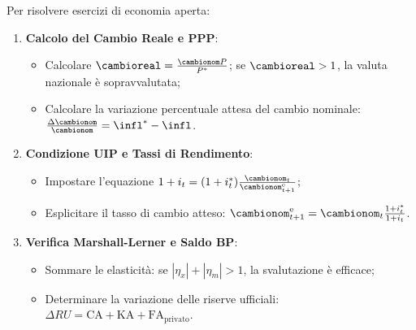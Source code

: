\begin{metodo}
Per risolvere esercizi di economia aperta:
\begin{enumerate}
    \item \textbf{Calcolo del Cambio Reale e PPP}:
    \begin{itemize}
        \item Calcolare $\cambioreal = \frac{\cambionom P}{P^*}$; se $\cambioreal > 1$, la valuta nazionale è sopravvalutata;
        \item Calcolare la variazione percentuale attesa del cambio nominale: $\frac{\Delta \cambionom}{\cambionom} = \infl^* - \infl$.
    \end{itemize}
    \item \textbf{Condizione UIP e Tassi di Rendimento}:
    \begin{itemize}
        \item Impostare l'equazione $1 + i_t = (1 + i_t^*) \frac{\cambionom_t}{\cambionom_{t+1}^{\mathrm{e}}}$;
        \item Esplicitare il tasso di cambio atteso: $\cambionom_{t+1}^{\mathrm{e}} = \cambionom_t \frac{1 + i_t^*}{1 + i_t}$.
    \end{itemize}
    \item \textbf{Verifica Marshall-Lerner e Saldo BP}:
    \begin{itemize}
        \item Sommare le elasticità: se $|\eta_x| + |\eta_m| > 1$, la svalutazione è efficace;
        \item Determinare la variazione delle riserve ufficiali: $\Delta RU = \mathrm{CA} + \mathrm{KA} + \mathrm{FA}_{\text{privato}}$.
    \end{itemize}
\end{enumerate}
\end{metodo}

